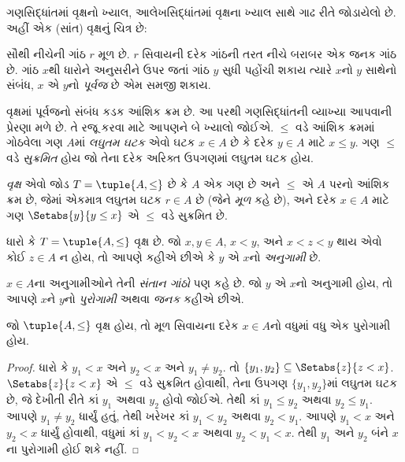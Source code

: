 ગણસિદ્ધાંતમાં વૃક્ષનો ખ્યાલ, આલેખસિદ્ધાંતમાં વૃક્ષના ખ્યાલ સાથે
ગાઢ રીતે જોડાયેલો છે. અહીં એક (સાંત) વૃક્ષનું ચિત્ર છે:

\begin{center}
\end{center}

સૌથી નીચેની ગાંઠ $r$ મૂળ છે. $r$ સિવાયની દરેક ગાંઠની
તરત નીચે બરાબર એક જનક ગાંઠ છે.
ગાંઠ $x$થી ધારોને અનુસરીને ઉપર જતાં ગાંઠ $y$ સુધી પહોંચી
શકાય ત્યારે $x$નો $y$ સાથેનો સંબંધ,
$x$ એ $y$નો \emph{પૂર્વજ} છે એમ સમજી શકાય.

વૃક્ષમાં પૂર્વજનો સંબંધ કડક આંશિક ક્રમ છે.
આ પરથી ગણસિદ્ધાંતની વ્યાખ્યા આપવાની પ્રેરણા મળે છે.
તે રજૂ કરવા માટે આપણને બે ખ્યાલો જોઈએ.
$\le$ વડે આંશિક ક્રમમાં ગોઠવેલા ગણ $A$માં
\emph{લઘુતમ ઘટક} એવો ઘટક $x \in A$ છે
કે દરેક $y \in A$ માટે $x \le y$.
ગણ $\le$ વડે \emph{સુક્રમિત} હોય જો તેના દરેક
અરિક્ત ઉપગણમાં લઘુતમ ઘટક હોય.

\begin{defn}[વૃક્ષ]
\emph{વૃક્ષ} એવો જોડ $T = \tuple{A, \le}$ છે કે $A$ એક ગણ છે
અને $\le$ એ $A$ પરનો આંશિક ક્રમ છે, જેમાં એકમાત્ર લઘુતમ
ઘટક $r \in A$ છે (જેને \emph{મૂળ} કહે છે), અને
દરેક $x \in A$ માટે ગણ $\Setabs{y}{y \le x}$
એ $\le$ વડે સુક્રમિત છે.
\end{defn}

\begin{defn}[અનુગામીઓ]
ધારો કે $T = \tuple{A, \le}$ વૃક્ષ છે.
જો $x,y \in A$, $x < y$, અને $x < z < y$
થાય એવો કોઈ $z \in A$ ન હોય, તો આપણે કહીએ છીએ કે
$y$ એ $x$નો \emph{અનુગામી} છે.
\end{defn}

$x \in A$ના અનુગામીઓને તેની \emph{સંતાન ગાંઠો} પણ કહે છે.
જો $y$ એ $x$નો અનુગામી હોય, તો આપણે $x$ને $y$નો
\emph{પુરોગામી} અથવા \emph{જનક} કહીએ છીએ.

\begin{prop}
જો $\tuple{A,\le}$ વૃક્ષ હોય, તો મૂળ સિવાયના
દરેક $x \in A$નો વધુમાં વધુ એક પુરોગામી હોય.
\end{prop}

\begin{proof}
  ધારો કે $y_1 < x$ અને $y_2 < x$ અને $y_1 \neq y_2$.
  તો $\{y_1, y_2\} \subseteq \Setabs{z}{z<x}$.
  $\Setabs{z}{z<x}$ એ $\le$ વડે સુક્રમિત હોવાથી,
  તેના ઉપગણ $\{y_1, y_2\}$માં લઘુતમ ઘટક છે,
  જે દેખીતી રીતે કાં $y_1$ અથવા $y_2$ હોવો જોઈએ.
  તેથી કાં $y_1 \le y_2$ અથવા $y_2 \le y_1$.
  આપણે $y_1 \neq y_2$ ધાર્યું હતું, તેથી ખરેખર
  કાં $y_1 < y_2$ અથવા $y_2 < y_1$.
  આપણે $y_1 < x$ અને $y_2 < x$ ધાર્યું હોવાથી,
  વધુમાં કાં $y_1 < y_2 < x$ અથવા $y_2 < y_1 < x$.
  તેથી $y_1$ અને $y_2$ બંને $x$ના પુરોગામી હોઈ શકે નહીં.
\end{proof}

